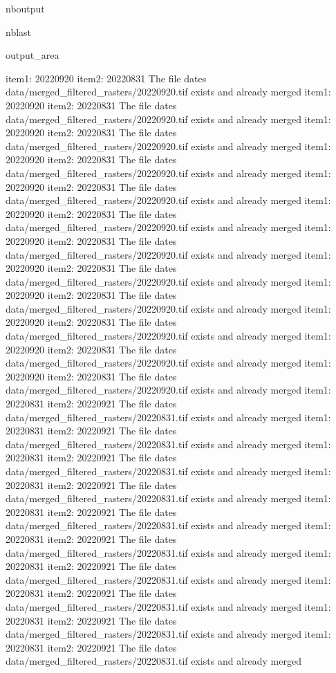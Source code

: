 \documentclass[letterpaper,10pt]{sphinxmanual}
\begin{document}
\begin{sphinxuseclass}{nboutput}
\begin{sphinxuseclass}{nblast}
{\begin{sphinxuseclass}{output_area}
\begin{sphinxuseclass}{}
\begin{sphinxVerbatim}[commandchars=\\\{\}]
item1:  20220920
item2:  20220831
The file dates data/merged\_filtered\_rasters/20220920.tif exists and already merged
item1:  20220920
item2:  20220831
The file dates data/merged\_filtered\_rasters/20220920.tif exists and already merged
item1:  20220920
item2:  20220831
The file dates data/merged\_filtered\_rasters/20220920.tif exists and already merged
item1:  20220920
item2:  20220831
The file dates data/merged\_filtered\_rasters/20220920.tif exists and already merged
item1:  20220920
item2:  20220831
The file dates data/merged\_filtered\_rasters/20220920.tif exists and already merged
item1:  20220920
item2:  20220831
The file dates data/merged\_filtered\_rasters/20220920.tif exists and already merged
item1:  20220920
item2:  20220831
The file dates data/merged\_filtered\_rasters/20220920.tif exists and already merged
item1:  20220920
item2:  20220831
The file dates data/merged\_filtered\_rasters/20220920.tif exists and already merged
item1:  20220920
item2:  20220831
The file dates data/merged\_filtered\_rasters/20220920.tif exists and already merged
item1:  20220920
item2:  20220831
The file dates data/merged\_filtered\_rasters/20220920.tif exists and already merged
item1:  20220920
item2:  20220831
The file dates data/merged\_filtered\_rasters/20220920.tif exists and already merged
item1:  20220920
item2:  20220831
The file dates data/merged\_filtered\_rasters/20220920.tif exists and already merged
item1:  20220831
item2:  20220921
The file dates data/merged\_filtered\_rasters/20220831.tif exists and already merged
item1:  20220831
item2:  20220921
The file dates data/merged\_filtered\_rasters/20220831.tif exists and already merged
item1:  20220831
item2:  20220921
The file dates data/merged\_filtered\_rasters/20220831.tif exists and already merged
item1:  20220831
item2:  20220921
The file dates data/merged\_filtered\_rasters/20220831.tif exists and already merged
item1:  20220831
item2:  20220921
The file dates data/merged\_filtered\_rasters/20220831.tif exists and already merged
item1:  20220831
item2:  20220921
The file dates data/merged\_filtered\_rasters/20220831.tif exists and already merged
item1:  20220831
item2:  20220921
The file dates data/merged\_filtered\_rasters/20220831.tif exists and already merged
item1:  20220831
item2:  20220921
The file dates data/merged\_filtered\_rasters/20220831.tif exists and already merged
item1:  20220831
item2:  20220921
The file dates data/merged\_filtered\_rasters/20220831.tif exists and already merged
item1:  20220831
item2:  20220921
The file dates data/merged\_filtered\_rasters/20220831.tif exists and already merged

\end{sphinxVerbatim}
\end{sphinxuseclass}
\end{sphinxuseclass}}
\end{sphinxuseclass}
\end{sphinxuseclass}
\end{document}
